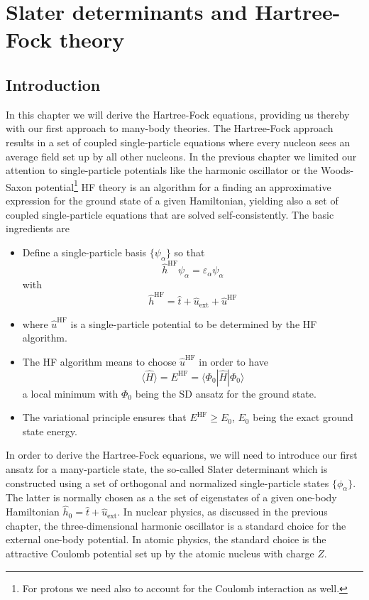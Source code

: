 \chapter{Slater determinants and Hartree-Fock theory}

\section{Introduction}

In this chapter we will derive the Hartree-Fock equations, providing us thereby with our first approach
to many-body theories. The Hartree-Fock approach 
results in  a set of coupled single-particle equations where every nucleon sees an
average field set up by all other nucleons. In the previous chapter we limited our attention to single-particle potentials
like the harmonic oscillator or the Woods-Saxon potential\footnote{For protons we need also to account for the Coulomb  interaction as 
well.} 
HF theory is an algorithm for a finding an approximative expression
for the ground state of a given Hamiltonian, yielding also a set of
coupled single-particle equations that are solved self-consistently.
The basic ingredients are
\begin{itemize}
\item Define a single-particle basis $\{\psi_{\alpha}\}$ so that
\[ \hat{h}^{\mathrm{HF}}\psi_{\alpha} = \varepsilon_{\alpha}\psi_{\alpha}\]
with
\[
\hat{h}^{\mathrm{HF}}=\hat{t}+\hat{u}_{\mathrm{ext}}+\hat{u}^{\mathrm{HF}}
\]
\item where $\hat{u}^{\mathrm{HF}}$ is a single-particle potential to
  be determined by the HF algorithm.
\item The HF algorithm means to choose $\hat{u}^{\mathrm{HF}}$ in
  order to have
\[ \langle \hat{H} \rangle = E^{\mathrm{HF}}= \langle \Phi_0 | \hat{H}|\Phi_0 \rangle\]
a local minimum with $\Phi_0$ being the SD ansatz for the ground
state.
\item The variational principle ensures that $E^{\mathrm{HF}} \ge
  E_0$, $E_0$ being the exact ground state energy.
\end{itemize}
In order to derive the Hartree-Fock equarions, we will need to
introduce our first ansatz for a many-particle state, the so-called
Slater determinant which is constructed using a set of orthogonal and
normalized single-particle states $\{\phi_{\alpha}\}$. The latter is
normally chosen as a the set of eigenstates of a given one-body
Hamiltonian $\hat{h}_0=\hat{t}+\hat{u}_{\mathrm{ext}}$. In nuclear
physics, as discussed in the previous chapter, the three-dimensional
harmonic oscillator is a standard choice for the external one-body
potential.  In atomic physics, the standard choice is the attractive
Coulomb potential set up by the atomic nucleus with charge $Z$.

